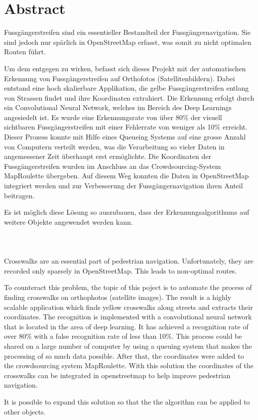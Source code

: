 \section{Abstract}

Fussgängerstreifen sind ein essentieller Bestandteil der Fussgängernavigation. Sie sind jedoch nur spärlich in OpenStreetMap erfasst, was somit zu nicht optimalen Routen führt.

Um dem entgegen zu wirken,  befasst sich dieses Projekt mit der automatischen Erkennung von Fussgängerstreifen auf Orthofotos (Satellitenbildern). 
Dabei entstand eine hoch skalierbare Applikation, die gelbe Fussgängerstreifen entlang von Strassen findet und ihre Koordinaten extrahiert. Die Erkennung erfolgt durch ein Convolutional Neural Network, welches im Bereich des Deep Learnings angesiedelt ist.
Es wurde eine Erkennungsrate von über 80\% der visuell sichtbaren Fussgängerstreifen mit einer Fehlerrate von weniger als 10\% erreicht. Dieser Prozess konnte mit Hilfe eines Queueing Systems auf eine grosse Anzahl von Computern verteilt werden, was die Verarbeitung so vieler Daten in angemessener Zeit überhaupt erst ermöglichte. Die Koordinaten der Fussgängerstreifen wurden im Anschluss an das Crowdsourcing-System MapRoulette übergeben. Auf diesem Weg konnten die Daten in OpenStreetMap integriert werden und zur Verbesserung der Fussgängernavigation ihren Anteil beitragen.

Es ist möglich diese Lösung so auszubauen, dass der Erkennungsalgorithums auf weitere Objekte angewendet werden kann.\\ \\ \\ \\




Crosswalks are an essential part of pedestrian navigation. Unfortunately, they are recorded only sparsely in OpenStreetMap. This leads to non-optimal routes.

To counteract this problem, the topic of this poject is to automate the process of finding crosswalks on orthophotos (satellite images). The result is a highly scalable application which finds yellow crosswalks along streets and extracts their coordinates. The recognition is implemented with a convolutional neural network that is located in the area of deep learning. It has achieved a recognition rate of over 80\% with a false recognition rate of less than 10\%. This process could be shared on a large number of computer by using a queuing system that makes the processing of so much data possible. After that, the coordinates were added to the crowdsourcing system MapRoulette. With this solution the coordinates of the crosswalks can be integrated in openstreetmap to help improve pedestrian navigation.

It is possible to expand this solution so that the the algorithm can be applied to other objects.

